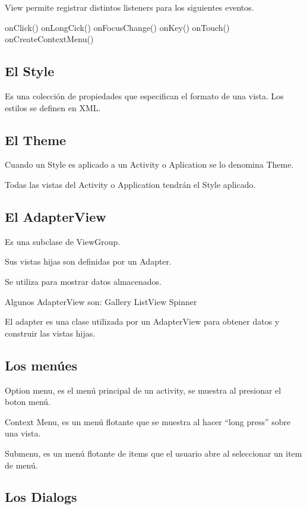 View permite registrar distintos listeners para los siguientes  eventos.

onClick()
onLongCick()
onFocusChange()
onKey()
onTouch()
onCreateContextMenu()

\subsection{El Style}
\label{subsec:dev.style}

Es una colecci\'on de propiedades que especifican el formato de una vista. Los estilos se definen en XML.

\subsection{El Theme}
\label{subsec:dev.theme}

Cuando un Style es aplicado a un Activity o Aplication se lo denomina Theme.

Todas las vistas del Activity o Application tendr\'an el Style aplicado.

\subsection{El AdapterView}
\label{subsec:dev.adapterView}

Es una subclase de ViewGroup.

Sus vistas hijas son definidas por un Adapter.

Se utiliza para mostrar datos almacenados.

Algunos AdapterView son:
Gallery
ListView
Spinner

El adapter es una clase utilizada por un AdapterView para obtener datos y  construir las vistas hijas.

\subsection{Los men\'ues}
\label{subsec:dev.menus}

Option menu, es el men\'u principal de un activity, se muestra  al presionar el boton men\'u.

Context Menu, es un men\'u flotante que se muestra al hacer  “long press” sobre una vista.

Submenu, es un men\'u flotante de items que el usuario abre al  seleccionar un item de men\'u.

\subsection{Los Dialogs}
\label{subsec:dev.dialogs}

